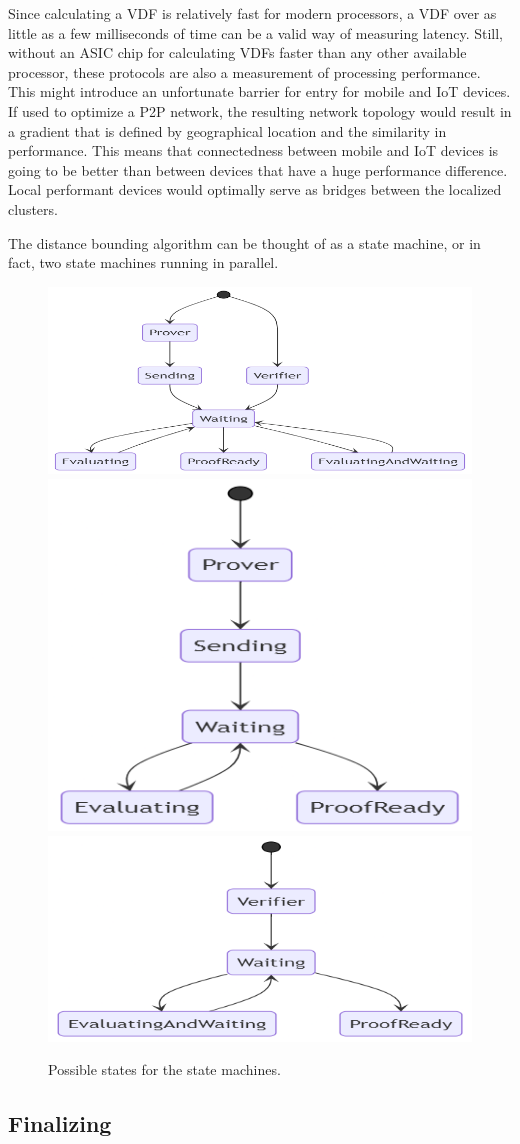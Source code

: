 Since calculating a VDF is relatively fast for modern processors, a VDF over as little as a few milliseconds of time can be a valid way of measuring latency. Still, without an ASIC chip for calculating VDFs faster than any other available processor, these protocols are also a measurement of processing performance. This might introduce an unfortunate barrier for entry for mobile and IoT devices. If used to optimize a P2P network, the resulting network topology would result in a gradient that is defined by geographical location and the similarity in performance. This means that connectedness between mobile and IoT devices is going to be better than between devices that have a huge performance difference. Local performant devices would optimally serve as bridges between the localized clusters.

The distance bounding algorithm can be thought of as a state machine, or in fact, two state machines running in parallel.

\begin{figure}[htp]

	\centering
	\includegraphics[width=.3\textwidth]{pictures/mermaid-diagram-20210505012010.png}\hfill
	\includegraphics[width=.3\textwidth]{pictures/mermaid-diagram-20210505014229.png}\hfill
	\includegraphics[width=.3\textwidth]{pictures/mermaid-diagram-20210505015712.png}

	\caption{Possible states for the state machines.}
	\label{Protocol States}

\end{figure}

\subsection{Finalizing}

